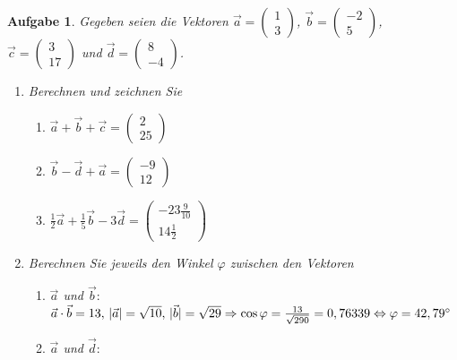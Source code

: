 \documentclass[12pt]{article}
\newtheorem{exercise}[satz]{Aufgabe}
\begin{document}
\begin{exercise}
  Gegeben seien die Vektoren
  $\vec{a}=\left(\begin{array}{r} 1 \\ 3 \end{array}\right)$,
  $\vec{b}=\left(\begin{array}{r} -2 \\ 5 \end{array}\right)$,\\
  $\vec{c}=\left(\begin{array}{r} 3 \\ 17 \end{array}\right)$ und
  $\vec{d}=\left(\begin{array}{r} 8 \\ -4 \end{array}\right)$.
  \begin{enumerate}
  \item[(a)] Berechnen und zeichnen Sie
      \begin{enumerate}
      \item[(i)] $\vec{a}+\vec{b}+\vec{c}=\left(\begin{array}{r} 2 \\ 25 \end{array}            \right)$
      \item[(ii)] $\vec{b}-\vec{d}+\vec{a}=\left(\begin{array}{r} -9 \\ 12 \end{array}              \right)$
      \item[(iii)] $\frac{1}{2}\vec{a}+\frac{1}{5}\vec{b}-3\vec{d}=\left(\begin{array}{r} -23\frac{9}{10} \\ 14\frac{1}{2} \end{array}\right)$
      \end{enumerate}
  \item[(b)] Berechnen Sie jeweils den Winkel $\varphi$ zwischen den Vektoren
    \begin{enumerate}
      \item[(i)] $\vec{a}$ und $\vec{b}:$\\
                 $\vec{a}\cdot\vec{b}=13, \,\vert\vec{a}\vert=\sqrt{10}, \, \vert\vec{b}\vert=\sqrt{29} \\ 
                 \Rightarrow \cos{\varphi}=\frac{13}{\sqrt{290}}=0,76339 \Leftrightarrow \varphi = 42,79^\circ$
      \item[(ii)] $\vec{a}$ und $\vec{d}:$\\

\end{enumerate}
\end{enumerate}
\end{exercise}
\end{document}
